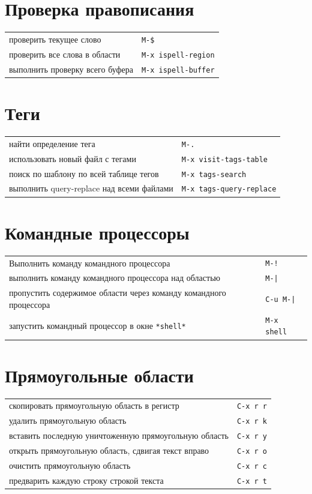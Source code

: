 \documentclass[10pt]{article}
\newlength{\ColWidth}
\newcommand{\kbd}[1]{\texttt{#1}}
\begin{document}
\section{Проверка правописания}

\begin{tabular}{p{\ColWidth}l}
проверить текущее слово & \kbd{M-\$} \\
проверить все слова в области & \kbd{M-x ispell-region} \\
выполнить проверку всего буфера & \kbd{M-x ispell-buffer} \\
\end{tabular}

\section{Теги}

\begin{tabular}{p{\ColWidth}l}
найти определение тега & \kbd{M-.} \\
использовать новый файл с тегами & \kbd{M-x visit-tags-table} \\

поиск по шаблону по всей таблице тегов & \kbd{M-x tags-search} \\
выполнить query-replace над всеми файлами & \kbd{M-x tags-query-replace} \\
\end{tabular}

\section{Командные процессоры}

\begin{tabular}{p{\ColWidth}l}
Выполнить команду командного процессора & \kbd{M-!} \\
выполнить команду командного процессора над областью & \kbd{M-|} \\
пропустить содержимое области через команду командного процессора & \kbd{C-u M-|} \\
запустить командный процессор в окне \kbd{*shell*} & \kbd{M-x shell} \\
\end{tabular}

\section{Прямоугольные области}

\begin{tabular}{p{\ColWidth}l}
скопировать прямоугольную область в регистр & \kbd{C-x r r} \\
удалить прямоугольную область & \kbd{C-x r k} \\
вставить последную уничтоженную прямоугольную область & \kbd{C-x r y} \\
открыть прямоугольную область, сдвигая текст вправо & \kbd{C-x r o} \\
очистить прямоугольную область & \kbd{C-x r c} \\
предварить каждую строку строкой текста & \kbd{C-x r t} \\
\end{tabular}
\end{document}
